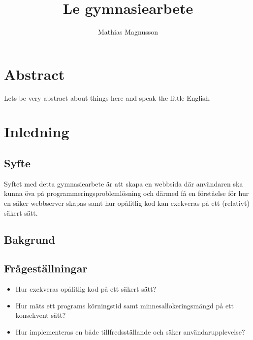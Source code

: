 \documentclass{article}
\author{Mathias Magnusson}
\title{Le gymnasiearbete}
\date{}
\begin{document}
\maketitle{}

\section*{Abstract}

Lets be very abstract about things here and speak the little English.

\clearpage

\tableofcontents

\clearpage

\section{Inledning}

\subsection{Syfte}

Syftet med detta gymnasiearbete är att skapa en webbsida där användaren ska
kunna öva på programmeringsproblemlösning och därmed få en förståelse för hur
en säker webbserver skapas samt hur opålitlig kod kan exekveras på ett
(relativt) säkert sätt.

\subsection{Bakgrund}

\subsection{Frågeställningar}

\begin{itemize}
	\item Hur exekveras opålitlig kod på ett säkert sätt?
	\item
		Hur mäts ett programs körningstid samt minnesallokeringsmängd på ett
		konsekvent sätt?
	\item
		Hur implementeras en både tillfredsställande och säker
		användarupplevelse?

\end{itemize}

\end{document}
